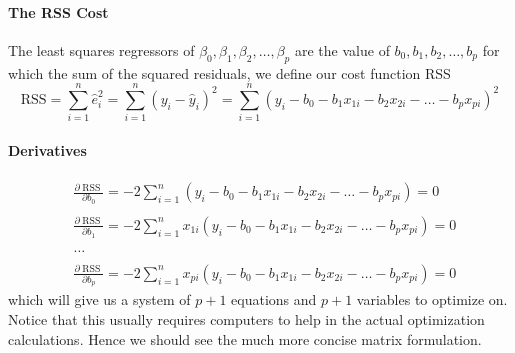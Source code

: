 \documentclass[10pt]{article}
\begin{document}
\paragraph{The RSS Cost}
The least squares regressors of $\beta_{0}, \beta_{1}, \beta_{2}, \ldots, \beta_{p}$ are the value of $b_{0}, b_{1}, b_{2}, \ldots, b_{p}$ for which the sum of the squared residuals, we define our cost function RSS
\begin{equation*}
    \mathrm{RSS}=\sum_{i=1}^{n} \hat{e}_{i}^{2}=\sum_{i=1}^{n}\left(y_{i}-\hat{y}_{i}\right)^{2}=\sum_{i=1}^{n}\left(y_{i}-b_{0}-b_{1} x_{1 i}-b_{2} x_{2 i}-\ldots-b_{p} x_{p i}\right)^{2}
\end{equation*}
\paragraph{Derivatives}
\begin{equation*}
    \begin{matrix}
        &\frac{\partial \operatorname{RSS}}{\partial b_{0}}=-2 \sum_{i=1}^{n}\left(y_{i}-b_{0}-b_{1} x_{1 i}-b_{2} x_{2 i}-\ldots-b_{p} x_{p i}\right)=0 \quad \,\,\\ \\
        &\frac{\partial \operatorname{RSS}}{\partial b_{1}}=-2 \sum_{i=1}^{n} x_{1 i}\left(y_{i}-b_{0}-b_{1} x_{1 i}-b_{2} x_{2 i}-\ldots-b_{p} x_{p i}\right)=0\\ \\
        & \dots \\ \\
        &\frac{\partial \operatorname{RSS}}{\partial b_{p}}=-2 \sum_{i=1}^{n} x_{p i}\left(y_{i}-b_{0}-b_{1} x_{1 i}-b_{2} x_{2 i}-\ldots-b_{p} x_{p i}\right)=0
    \end{matrix}
\end{equation*}
which will give us a system of $p+1$ equations and $p+1$ variables to optimize on. Notice that this usually requires computers to help in the actual optimization calculations. Hence we should see the much more concise matrix formulation.
\end{document}

